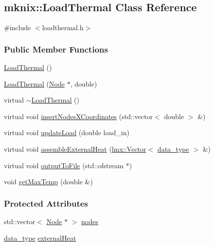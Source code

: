 \hypertarget{classmknix_1_1_load_thermal}{}\subsection{mknix\+:\+:Load\+Thermal Class Reference}
\label{classmknix_1_1_load_thermal}


{\ttfamily \#include $<$loadthermal.\+h$>$}

\subsubsection*{Public Member Functions}
\begin{DoxyCompactItemize}
\item 
\hyperlink{classmknix_1_1_load_thermal_ab7ff9a690520689fc6858ea53e35ba00}{Load\+Thermal} ()
\item 
\hyperlink{classmknix_1_1_load_thermal_ac49667e09675aa6ebacb3fcb0c85aa99}{Load\+Thermal} (\hyperlink{classmknix_1_1_node}{Node} $\ast$, double)
\item 
virtual \hyperlink{classmknix_1_1_load_thermal_ab38fec6f4ee9b13d9de9783ab9d0dbcc}{$\sim$\+Load\+Thermal} ()
\item 
virtual void \hyperlink{classmknix_1_1_load_thermal_a7c021ef905f65e44fd1823882bb68642}{insert\+Nodes\+X\+Coordinates} (std\+::vector$<$ double $>$ \&)
\item 
virtual void \hyperlink{classmknix_1_1_load_thermal_a2aa43f7e29df09c2c1537cef2abdcbb1}{update\+Load} (double load\+\_\+in)
\item 
virtual void \hyperlink{classmknix_1_1_load_thermal_a52707d674973fe59113955dc86024888}{assemble\+External\+Heat} (\hyperlink{classlmx_1_1_vector}{lmx\+::\+Vector}$<$ \hyperlink{namespacemknix_a16be4b246fbf2cceb141e3a179111020}{data\+\_\+type} $>$ \&)
\item 
virtual void \hyperlink{classmknix_1_1_load_thermal_a860e0d826647b64224c6eb452f19c9bf}{output\+To\+File} (std\+::ofstream $\ast$)
\item 
void \hyperlink{classmknix_1_1_load_thermal_a4da55a71b40f4561d3ce59e1efce0655}{get\+Max\+Temp} (double \&)
\end{DoxyCompactItemize}
\subsubsection*{Protected Attributes}
\begin{DoxyCompactItemize}
\item 
std\+::vector$<$ \hyperlink{classmknix_1_1_node}{Node} $\ast$ $>$ \hyperlink{classmknix_1_1_load_thermal_a3a60314d26f6c3f45269fe80a620fdab}{nodes}
\item 
\hyperlink{namespacemknix_a16be4b246fbf2cceb141e3a179111020}{data\+\_\+type} \hyperlink{classmknix_1_1_load_thermal_a0d609c33555793457932bfca4c1b6e0c}{external\+Heat}
\end{DoxyCompactItemize}


